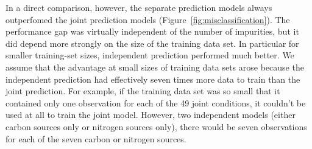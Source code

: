 \documentclass[12pt]{article}
\begin{document}
In a direct comparison, however, the separate prediction models always outperfomed the joint prediction models (Figure~\ref{fig:misclassification}). The performance gap was virtually independent of the number of impurities, but it did depend more strongly on the size of the training data set. In particular for smaller training-set sizes, independent prediction performed much better. We assume that the advantage at small sizes of training data sets arose because the independent prediction had effectively seven times more data to train than the joint prediction. For example, if the training data set was so small that it contained only one observation for each of the 49 joint conditions, it couldn't be used at all to train the joint model. However, two independent models (either carbon sources only or nitrogen sources only), there would be seven observations for each of the seven carbon or nitrogen sources.
\end{document}
